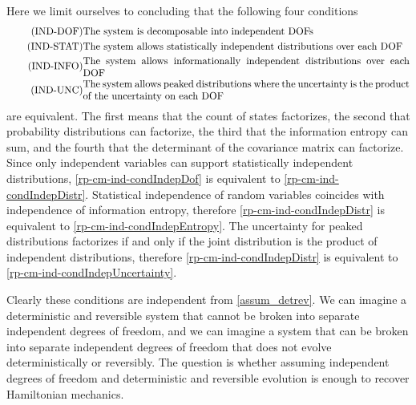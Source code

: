 Here we limit ourselves to concluding that the following four conditions
\begin{align}
	\tag{IND-DOF}\label{rp-cm-ind-condIndepDof}
	&\eqtext{The system is decomposable into independent DOFs} \\
	\tag{IND-STAT}\label{rp-cm-ind-condIndepDistr}
	&\eqtext{The system allows statistically independent distributions over each DOF} \\
	\tag{IND-INFO}\label{rp-cm-ind-condIndepEntropy}
	&\eqtext{The system allows informationally independent distributions over each DOF} \\
	\tag{IND-UNC}\label{rp-cm-ind-condIndepUncertainty}
	&\eqtext{The system allows peaked distributions where the uncertainty is the product of the uncertainty on each DOF}
\end{align}
are equivalent. The first means that the count of states factorizes, the second that probability distributions can factorize, the third that the information entropy can sum, and the fourth that the determinant of the covariance matrix can factorize. Since only independent variables can support statistically independent distributions, \ref{rp-cm-ind-condIndepDof} is equivalent to \ref{rp-cm-ind-condIndepDistr}. Statistical independence of random variables coincides with independence of information entropy, therefore \ref{rp-cm-ind-condIndepDistr} is equivalent to \ref{rp-cm-ind-condIndepEntropy}. The uncertainty for peaked distributions factorizes if and only if the joint distribution is the product of independent distributions, therefore  \ref{rp-cm-ind-condIndepDistr} is equivalent to \ref{rp-cm-ind-condIndepUncertainty}.

Clearly these conditions are independent from \ref{assum_detrev}. We can imagine a deterministic and reversible system that cannot be broken into separate independent degrees of freedom, and we can imagine a system that can be broken into separate independent degrees of freedom that does not evolve deterministically or reversibly. The question is whether assuming independent degrees of freedom and deterministic and reversible evolution is enough to recover Hamiltonian mechanics. 

